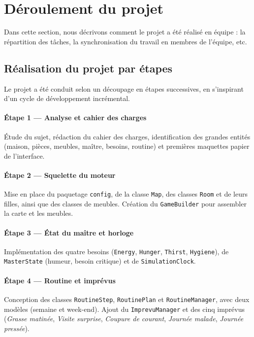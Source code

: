 \newpage
\section{Déroulement du projet}
\label{sec:equipe}

Dans cette section, nous décrivons comment le projet a été réalisé en équipe : la répartition des tâches, la synchronisation du travail en membres de l'équipe, etc.

\subsection{Réalisation du projet par étapes}

Le projet a été conduit selon un découpage en étapes successives, en s'inspirant d'un cycle de développement incrémental.

\paragraph{Étape 1 — Analyse et cahier des charges} Étude du sujet, rédaction du cahier des charges, identification des grandes entités (maison, pièces, meubles, maître, besoins, routine) et premières maquettes papier de l'interface.

\paragraph{Étape 2 — Squelette du moteur} Mise en place du paquetage \texttt{config}, de la classe \texttt{Map}, des classes \texttt{Room} et de leurs filles, ainsi que des classes de meubles. Création du \texttt{GameBuilder} pour assembler la carte et les meubles.

\paragraph{Étape 3 — État du maître et horloge} Implémentation des quatre besoins (\texttt{Energy}, \texttt{Hunger}, \texttt{Thirst}, \texttt{Hygiene}), de \texttt{MasterState} (humeur, besoin critique) et de \texttt{SimulationClock}.

\paragraph{Étape 4 — Routine et imprévus} Conception des classes \texttt{RoutineStep}, \texttt{RoutinePlan} et \texttt{RoutineManager}, avec deux modèles (semaine et week-end). Ajout du \texttt{ImprevuManager} et des cinq imprévus (\textit{Grasse matinée}, \textit{Visite surprise}, \textit{Coupure de courant}, \textit{Journée malade}, \textit{Journée pressée}).

